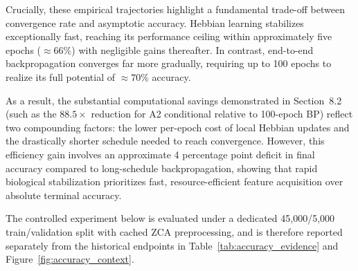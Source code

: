 \documentclass{article}
\begin{document}
    Crucially, these empirical trajectories highlight a fundamental trade-off between convergence rate and asymptotic accuracy. Hebbian learning stabilizes exceptionally fast, reaching its performance ceiling within approximately five epochs ($\approx 66\%$) with negligible gains thereafter. In contrast, end-to-end backpropagation converges far more gradually, requiring up to 100 epochs to realize its full potential of $\approx 70\%$ accuracy.
    
    As a result, the substantial computational savings demonstrated in Section~8.2 (such as the $88.5\times$ reduction for A2 conditional relative to 100-epoch BP) reflect two compounding factors: the lower per-epoch cost of local Hebbian updates and the drastically shorter schedule needed to reach convergence. However, this efficiency gain involves an approximate 4 percentage point deficit in final accuracy compared to long-schedule backpropagation, showing that rapid biological stabilization prioritizes fast, resource-efficient feature acquisition over absolute terminal accuracy.

    {\color{red}The controlled experiment below is evaluated under a dedicated 45,000/5,000 train/validation split with cached ZCA preprocessing, and is therefore reported separately from the historical endpoints in Table~\ref{tab:accuracy_evidence} and Figure~\ref{fig:accuracy_context}.}
    
\end{document}
